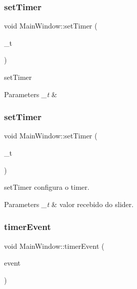 \subsubsection{\texorpdfstring{set\+Timer}{setTimer}\hspace{0.1cm}{\footnotesize\ttfamily [1/2]}}
{\footnotesize\ttfamily void Main\+Window\+::set\+Timer (\begin{DoxyParamCaption}\item[{int}]{\+\_\+t }\end{DoxyParamCaption})\hspace{0.3cm}{\ttfamily [slot]}}



set\+Timer 


\begin{DoxyParams}{Parameters}
{\em \+\_\+t} & \\
\hline
\end{DoxyParams}
\mbox{\label{class_main_window_ab5db2dcd9b9592285a18fa7d19256e6a}} 
\subsubsection{\texorpdfstring{set\+Timer}{setTimer}\hspace{0.1cm}{\footnotesize\ttfamily [2/2]}}
{\footnotesize\ttfamily void Main\+Window\+::set\+Timer (\begin{DoxyParamCaption}\item[{int}]{\+\_\+t }\end{DoxyParamCaption})\hspace{0.3cm}{\ttfamily [slot]}}



set\+Timer configura o timer. 


\begin{DoxyParams}{Parameters}
{\em \+\_\+t} & valor recebido do slider. \\
\hline
\end{DoxyParams}
\mbox{\label{class_main_window_aaa425b1554af3c1f58cc70b4815082ae}} 
\subsubsection{\texorpdfstring{timer\+Event}{timerEvent}\hspace{0.1cm}{\footnotesize\ttfamily [1/2]}}
{\footnotesize\ttfamily void Main\+Window\+::timer\+Event (\begin{DoxyParamCaption}\item[{Q\+Timer\+Event $\ast$}]{event }\end{DoxyParamCaption})\hspace{0.3cm}{\ttfamily [slot]}}



